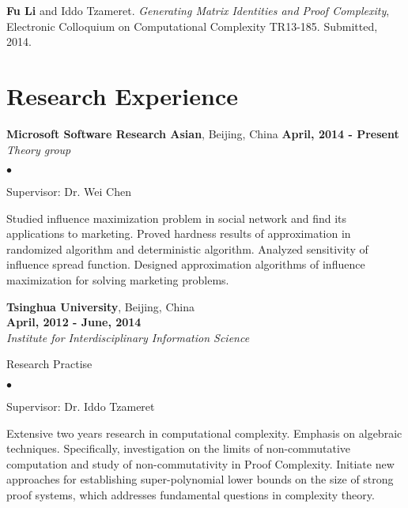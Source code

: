 \documentclass[margin,line]{res}
\newenvironment{list1}{
  \begin{list}{\ding{113}}{%
      \setlength{\itemsep}{0in}
      \setlength{\parsep}{0in} \setlength{\parskip}{0in}
      \setlength{\topsep}{0in} \setlength{\partopsep}{0in}
      \setlength{\leftmargin}{0.17in}}}{\end{list}}
\newenvironment{list2}{
  \begin{list}{$\bullet$}{%
      \setlength{\itemsep}{0in}
      \setlength{\parsep}{0in} \setlength{\parskip}{0in}
      \setlength{\topsep}{0in} \setlength{\partopsep}{0in}
      \setlength{\leftmargin}{0.2in}}}{\end{list}}
\begin{document}
\begin{resume}
{\bf Fu Li} and Iddo Tzameret. \textit{Generating Matrix Identities and Proof Complexity}, Electronic Colloquium on Computational Complexity TR13-185. Submitted, 2014.




\section{\sc Research Experience}

{\bf Microsoft Software Research Asian}, Beijing, China \hfill {\bf April, 2014 - Present}\\
{\em Theory group}\\
\vspace*{-.1in}
\begin{list1}
	\begin{list2}
		\vspace*{.05in}
		\item Supervisor: Dr. Wei Chen
		\item Studied influence maximization problem  in social network
		and find its applications to marketing. Proved hardness results of approximation in randomized algorithm and deterministic algorithm. Analyzed sensitivity of influence spread function. Designed approximation algorithms of influence maximization for solving marketing problems. 
		
	\end{list2}
	
	\vspace*{.05in}
\end{list1}



{\bf Tsinghua University}, Beijing, China \\
\vspace*{-.1in}
\hspace*{\fill} {\bf April, 2012 - June, 2014}\\
{\em Institute for Interdisciplinary Information Science}\\
\vspace*{-.1in}
\begin{list1}
\item[] Research Practise
\begin{list2}
\vspace*{.05in}
\item Supervisor: Dr. Iddo Tzameret
\item
Extensive two years research in computational complexity. Emphasis on algebraic techniques. Specifically, investigation on the limits of non-commutative computation  and study of non-commutativity in Proof Complexity.  Initiate new approaches for establishing super-polynomial lower bounds on the size of strong proof systems, which addresses fundamental questions in complexity theory.
\end{list2}
\vspace*{.05in}
\end{list1}


\end{resume}
\end{document}
